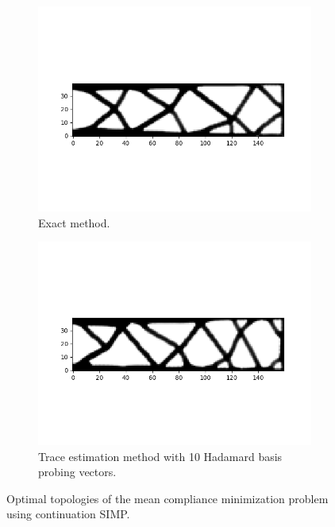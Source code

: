 \begin{figure}
  \begin{subfigure}[t]{0.8\textwidth}
    \centering
    \includegraphics[width=1\textwidth]{./images/robust_approx/exact_svd_mean_csimp.png}
    \caption{Exact method.}
  \end{subfigure} \hfill
  \begin{subfigure}[t]{0.8\textwidth}
    \centering
    \includegraphics[width=1\textwidth]{./images/robust_approx/trace_Hadamard10_mean_csimp.png}
    \caption{Trace estimation method with 10 Hadamard basis probing vectors.}
  \end{subfigure}
  \caption{Optimal topologies of the mean compliance minimization problem using continuation SIMP.}
  \label{fig:mean}
\end{figure}

